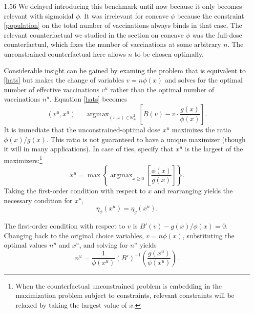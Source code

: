 \documentclass[12pt]{article}
\DeclareMathOperator*{\argmax}{argmax}
\newcommand{\efficacy}{\phi}
\newcommand{\general}{g}
\newcommand{\benefit}{B}
\newcommand{\xun}{x^{u}}
\newcommand{\nun}{n^{u}}
\newcommand{\vun}{v^{u}}
\newcommand{\Real}{\mathbb{R}_{+}}
\newcommand{\elasticity}[1]{\eta_{#1}}
\begin{document}
\begin{spacing}{1.56}
We delayed introducing this benchmark until now because it only
becomes relevant with sigmoidal $\efficacy$. It was irrelevant for
concave $\efficacy$ because the constraint \eqref{population} on the
total number of vaccinations always binds in that case. The relevant
counterfactual we studied in the section on concave $\efficacy$ was
the full-dose counterfactual, which fixes the number of vaccinations
at some arbitrary $n$. The unconstrained counterfactual here allows
$n$ to be chosen optimally.

Considerable insight can be gained by examing the problem that is
equivalent to \eqref{hats} but makes the change of variables $v = n
\efficacy(x)$ and solves for the optimal number of effective
vaccinations $\vun$ rather than the optimal number of vaccinations
$\nun$. Equation \eqref{hats} becomes
\begin{equation}
\label{hats2}
(\vun, \xun) = \argmax_{(v,x) \in \Real^2} \left[ \benefit(v) - v
  \cdot \frac{\general(x)}{\efficacy(x)} \right].
\end{equation}
It is immediate that the unconstrained-optimal dose $\xun$ maximizes
the ratio $\efficacy(x) / \general(x)$. This ratio is not guaranteed
to have a unique maximizer (though it will in many applications). In
case of ties, specify that $\xun$ is the largest of the
maximizers:\footnote{When the counterfactual unconstrained problem is
embedding in the maximization problem subject to constraints, relevant
constraints will be relaxed by taking the largest value of $x$.}
\begin{equation}
\label{max_ratio}
\xun = \max \left\{ \argmax_{x \geq 0} \left[
  \frac{\efficacy(x)}{\general(x)} \right] \right\}.
\end{equation}
Taking the first-order condition with respect to $x$ and rearranging
yields the necessary condition for $\xun$,
\begin{equation}
\label{equal_elasticities}
\elasticity{\efficacy}(\xun) = \elasticity{\general}(\xun). 
\end{equation}

The first-order condition with respect to $v$ is $ B'(v) - \general(x)
/ \efficacy(x) = 0$. Changing back to the original choice variables,
$v = n \efficacy(x)$, substituting the optimal values $\nun$ and
$\xun$, and solving for $\nun$ yields
\begin{equation}
\label{nhat}
\nun = \frac{1}{\efficacy(\xun)} (B')^{-1} \left(
\frac{\general(\xun)}{\efficacy(\xun)} \right).
\end{equation}


\end{spacing}
\end{document}
